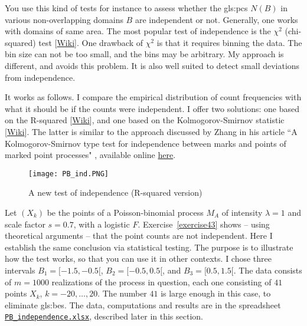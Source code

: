 \documentclass[10pt]{article}
\begin{document}
You use this kind of tests for instance to assess whether the \glspl{gls:pc} $N(B)$ in various non-overlapping domains $B$
are independent or not. Generally, one works with domains of same area. The most popular test of independence is the
$\chi^2$ (chi-squared) test [\href{https://en.wikipedia.org/wiki/Chi-squared_test}{Wiki}]. One drawback of $\chi^2$ is that it requires binning the data. The bin size
can not be too small, and the bins may be arbitrary. My approach is different, and avoids this problem. It is also well suited to detect small deviations from
independence.

It works as follows. I compare
the empirical distribution of count frequencies with what it should be
if the counts were independent.
I offer two solutions: one based on the R-squared [\href{https://en.wikipedia.org/wiki/Coefficient_of_determination}{Wiki}], and one based on the
\textcolor{index}{Kolmogorov-Smirnov statistic} [\href{https://bit.ly/3uJMMNK}{Wiki}]. The latter is similar to the approach discussed by Zhang
 in his article ``A Kolmogorov-Smirnov type test for independence between marks and points of marked point processes"
\cite{js2014},
available online \href{https://projecteuclid.org/journals/electronic-journal-of-statistics/volume-8/issue-2/A-Kolmogorov-Smirnov-type-test-for-independence-between-marks-and/10.1214/14-EJS961.full}{here}.


\begin{figure}[H]
\centering
\texttt{[image: PB\_ind.PNG]}
\caption{A new test of independence (R-squared version)}
\label{fig:pbindp}
\end{figure}

Let $(X_k)$ be the points of a Poisson-binomial process $M_A$ of intensity $\lambda=1$ and scale factor $s=0.7$, with a logistic $F$.  Exercise~\ref{exercise43} shows -- using theoretical arguments -- that the point counts are not independent. Here I establish the same conclusion via statistical testing. The purpose is to
illustrate how the test works, so that you can use it in other contexts. I chose three intervals $B_1=[-1.5,-0.5[$, $B_2=[-0.5,0.5[$, and $B_3=[0.5, 1.5[$. The data consists of $m=\num{1000}$ realizations of the process in question, each one consisting of $41$ points
$X_k$, $k=-20,\dots,20$. The number $41$ is large enough in this case, to eliminate \glspl{gls:be}.
The data, computations and results are
in the spreadsheet \href{https://github.com/VincentGranville/Point-Processes/tree/main/Spreadsheets}{\texttt{PB\_independence.xlsx}}, described later in this section.
\end{document}
